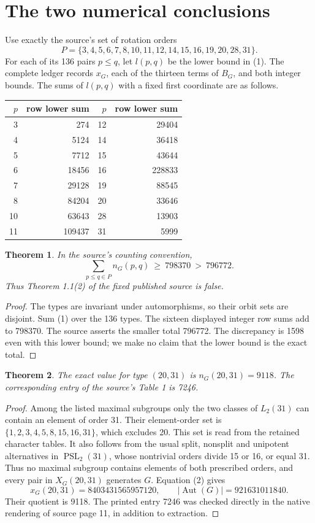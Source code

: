 \documentclass[11pt,a4paper]{article}
\newtheorem{theorem}{Theorem}
\newcommand{\Aut}{\operatorname{Aut}}
\begin{document}
\section{The two numerical conclusions}
Use exactly the source's set of rotation orders
\[
 P=\{3,4,5,6,7,8,10,11,12,14,15,16,19,20,28,31\}.
\]
For each of its 136 pairs $p\le q$, let $l(p,q)$ be the lower bound
in (1). The complete ledger records $x_G$, each of the thirteen terms
of $B_G$, and both integer bounds. The sums of $l(p,q)$ with a fixed
first coordinate are as follows.
\begin{center}\begin{tabular}{r|r@{\qquad}r|r}\toprule
$p$&row lower sum&$p$&row lower sum\\\midrule
3&274&12&29404\\
4&5124&14&36418\\
5&7712&15&43644\\
6&18456&16&228833\\
7&29128&19&88545\\
8&84204&20&33646\\
10&63643&28&13903\\
11&109437&31&5999\\\bottomrule
\end{tabular}\end{center}

\begin{theorem}\label{total}
In the source's counting convention,
\[
 \sum_{p\le q\in P} n_G(p,q)\ \ge\ 798370\ >\ 796772.
\]
Thus Theorem 1.1(2) of the fixed published source is false.
\end{theorem}
\begin{proof}
The types are invariant under automorphisms, so their orbit sets are
disjoint. Sum (1) over the 136 types. The sixteen displayed integer
row sums add to 798370. The source asserts the smaller total 796772.
The discrepancy is 1598 even with this lower bound; we make no claim
that the lower bound is the exact total.
\end{proof}

\begin{theorem}\label{entry}
The exact value for type $(20,31)$ is $n_G(20,31)=9118$.
The corresponding entry of the source's Table 1 is 7246.
\end{theorem}
\begin{proof}
Among the listed maximal subgroups only the two classes of $L_2(31)$
can contain an element of order 31. Their element-order set is
$\{1,2,3,4,5,8,15,16,31\}$, which excludes 20. This set is read from
the retained character tables. It also follows from the usual split,
nonsplit and unipotent alternatives in $\operatorname{PSL}_2(31)$,
whose nontrivial orders divide 15 or 16, or equal 31.
Thus no maximal subgroup contains elements of both prescribed orders,
and every pair in $X_G(20,31)$ generates $G$. Equation (2) gives
\[
 x_G(20,31)=8403431565957120,
 \qquad |\Aut(G)|=921631011840.
\]
Their quotient is 9118. The printed entry 7246 was checked directly
in the native rendering of source page 11, in addition to extraction.
\end{proof}
\end{document}

